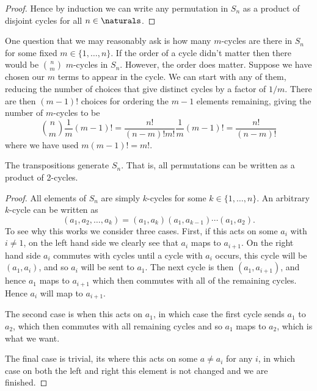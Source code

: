 \documentclass[fleqn]{NotesClass}
\begin{document}
\begin{lma}{}{}
\begin{proof}
            Hence by induction we can write any permutation in \(S_n\) as a product of disjoint cycles for all \(n \in \naturals\).
        \end{proof}
    \end{lma}
    
    One question that we may reasonably ask is how many \(m\)-cycles are there in \(S_n\) for some fixed \(m \in \{1, \dotsc, n\}\).
    If the order of a cycle didn't matter then there would be \(\binom{n}{m}\) \(m\)-cycles in \(S_n\).
    However, the order does matter.
    Suppose we have chosen our \(m\) terms to appear in the cycle.
    We can start with any of them, reducing the number of choices that give distinct cycles by a factor of \(1/m\).
    There are then \((m - 1)!\) choices for ordering the \(m - 1\) elements remaining, giving the number of \(m\)-cycles to be
    \begin{equation}
        \binom{n}{m} \frac{1}{m} (m - 1)! = \frac{n!}{(n - m)!m!}\frac{1}{m} (m - 1)! = \frac{n!}{(n - m)!}
    \end{equation}
    where we have used \(m(m - 1)! = m!\).
    
    \begin{thm}{}{}
        The transpositions generate \(S_n\).
        That is, all permutations can be written as a product of 2-cycles.
        
        \begin{proof}
            All elements of \(S_n\) are simply \(k\)-cycles for some \(k \in \{1, \dotsc, n\}\).
            An arbitrary \(k\)-cycle can be written as
            \begin{equation}
                (a_1, a_2, \dotsc, a_k) = (a_1, a_k)(a_1, a_{k-1}) \dotsm (a_1, a_2).
            \end{equation}
            To see why this works we consider three cases.
            First, if this acts on some \(a_i\) with \(i \ne 1\), on the left hand side we clearly see that \(a_i\) maps to \(a_{i + 1}\).
            On the right hand side \(a_{i}\) commutes with cycles until a cycle with \(a_{i}\) occurs, this cycle will be \((a_1, a_i)\), and so \(a_i\) will be sent to \(a_1\).
            The next cycle is then \((a_1, a_{i + 1})\), and hence \(a_1\) maps to \(a_{i + 1}\) which then commutes with all of the remaining cycles.
            Hence \(a_i\) will map to \(a_{i+1}\).
            
            The second case is when this acts on \(a_1\), in which case the first cycle sends \(a_1\) to \(a_2\), which then commutes with all remaining cycles and so \(a_1\) maps to \(a_2\), which is what we want.
            
            The final case is trivial, its where this acts on some \(a \ne a_i\) for any \(i\), in which case on both the left and right this element is not changed and we are finished.
        \end{proof}
    \end{thm}
    
\end{document}
